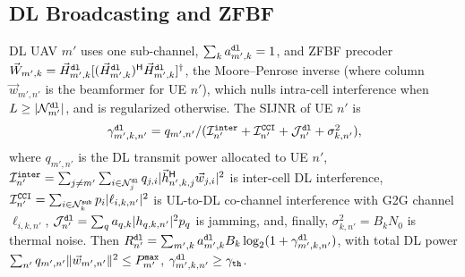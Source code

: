 \documentclass[journal]{IEEEtran}
\begin{document}
\subsection{DL Broadcasting and ZFBF}
\label{sec:dl}
DL UAV $m'$ uses one sub-channel, $\sum_k a_{m',k}^{\tt dl}=1$, and ZFBF precoder $\vec{W}_{m',k}=\vec{H}_{m',k}^{\tt dl}[(\vec{H}_{m',k}^{\tt dl})^{\sf H}\vec{H}_{m',k}^{\tt dl}]^{\dagger}$, the Moore--Penrose inverse {(where column $\vec{w}_{m',n'}$ is the beamformer for UE $n'$)}, which nulls intra-cell interference when $L\ge|\mathcal{N}_{m'}^{\tt dl}|$, and is regularized otherwise. The SIJNR of UE $n'$ is
\begin{equation}
\textstyle\gamma_{m',k,n'}^{\tt dl}=q_{m',n'}/(\mathcal{I}_{n'}^{\tt inter}+\mathcal{I}_{n'}^{\tt CCI}+\mathcal{J}_{n'}^{\tt dl}+\sigma_{k,n'}^2),
\label{eq:dl_sijnr}
\end{equation}
where {$q_{m',n'}$ is the DL transmit power allocated to UE $n'$}, $\mathcal{I}_{n'}^{\tt inter}=\sum_{j\neq m'}\sum_{i\in\mathcal{N}_j^{\tt dl}}q_{j,i}|\vec{h}_{n',k,j}^{\sf H}{\vec{w}_{j,i}}|^2$ is inter-cell DL interference,
$\mathcal{I}_{n'}^{\tt CCI}=\sum_{i\in\mathcal{N}_k^{\tt sub}}p_i|\ell_{i,k,n'}|^2$ is UL-to-DL co-channel interference with G2G channel $\ell_{i,k,n'}$,
$\mathcal{J}_{n'}^{\tt dl}=\sum_{q}a_{q,k}|h_{q,k,n'}|^2 p_q$ is jamming, and, finally,
$\sigma_{k,n'}^2=B_k N_0$ is thermal noise.
Then $R_{n'}^{\tt dl}=\sum_{m',k}a_{m',k}^{\tt dl}B_k\log_2(1+\gamma_{m',k,n'}^{\tt dl})$, with total DL power $\sum_{n'}q_{m',n'}\Vert\vec{w}_{m',n'}\Vert^2\le P_{m'}^{\tt max}$, $\gamma_{m',k,n'}^{\tt dl}\ge\gamma_{\tt th}$.
\end{document}
